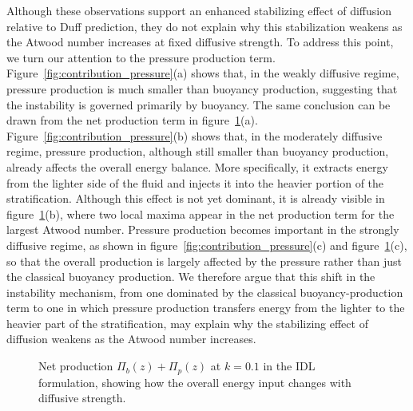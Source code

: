 \documentclass[11pt]{article}
\newif\ifloadfig
\newcommand{\figfile}[1]{\ifloadfig\fi}
\begin{document}
Although these observations support an enhanced stabilizing effect of diffusion relative to Duff prediction, they do not explain why this stabilization weakens as the Atwood number increases at fixed diffusive strength. To address this point, we turn our attention to the pressure production term. Figure~\ref{fig:contribution_pressure}(a) shows that, in the weakly diffusive regime, pressure production is much smaller than buoyancy production, suggesting that the instability is governed primarily by buoyancy. The same conclusion can be drawn from the net production term in figure~\ref{fig:contribution_sum_peclet}(a). Figure~\ref{fig:contribution_pressure}(b) shows that, in the moderately diffusive regime, pressure production, although still smaller than buoyancy production, already affects the overall energy balance. More specifically, it extracts energy from the lighter side of the fluid and injects it into the heavier portion of the stratification. Although this effect is not yet dominant, it is already visible in figure~\ref{fig:contribution_sum_peclet}(b), where two local maxima appear in the net production term for the largest Atwood number. Pressure production becomes important in the strongly diffusive regime, as shown in figure~\ref{fig:contribution_pressure}(c) and figure~\ref{fig:contribution_sum_peclet}(c), so that the overall production is largely affected by the pressure rather than just the classical buoyancy production. We therefore argue that this shift in the instability mechanism, from one dominated by the classical buoyancy-production term to one in which pressure production transfers energy from the lighter to the heavier part of the stratification, may explain why the stabilizing effect of diffusion weakens as the Atwood number increases.
\begin{figure}
    \centering
    \begin{minipage}[t]{0.31\textwidth}
        \centering
        \vspace{0pt}
        \figfile{figures/contribution_sum_Pe40}
    \end{minipage}
    \hfill
    \begin{minipage}[t]{0.31\textwidth}
        \centering
        \vspace{0pt}
        \figfile{figures/contribution_sum_Pe5}
    \end{minipage}
    \hfill
    \begin{minipage}[t]{0.32\textwidth}
        \centering
        \vspace{0pt}
        \figfile{figures/contribution_sum_Pe1}
    \end{minipage}
    \caption{Net production \(\Pi_b(z) + \Pi_p(z)\) at \(k=0.1\) in the IDL formulation, showing how the overall energy input changes with diffusive strength.}
    \label{fig:contribution_sum_peclet}
\end{figure}
\end{document}
